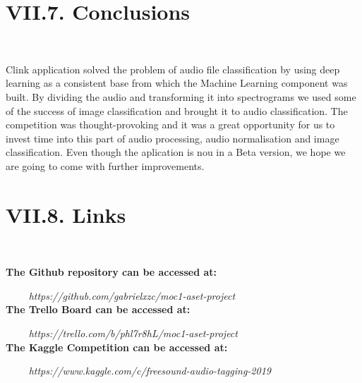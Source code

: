 \documentclass[11pt, a4papper]{report}
\theoremstyle{plain}
\theoremstyle{definition}
\theoremstyle{definition}
\theoremstyle{proposition}
\begin{document}
\section*{VII.7. Conclusions}
\

Clink application solved the problem of audio file classification by using deep learning as a consistent base from which the Machine Learning component was built. By dividing the audio and transforming it into spectrograms we used some of the success of image classification and brought it to audio classification. The competition was thought-provoking and it was a great opportunity for us to invest time into this part of audio processing, audio normalisation and image classification. Even though the aplication is nou in a Beta version, we hope we are going to come with further improvements.



\section*{VII.8. Links}
\

\textbf{\footnotemark The Github repository can be accessed at:}


\ \ \ \ \hspace{2cm} \textit{https://github.com/gabrielxzc/moc1-aset-project}
\\

\textbf{\footnotemark The Trello Board can be accessed at:}

\ \ \ \ \hspace{2cm} \textit{https://trello.com/b/phl7r8hL/moc1-aset-project}
\\

\textbf{The Kaggle Competition can be accessed at: }

\ \ \ \ \hspace{2cm} \textit{https://www.kaggle.com/c/freesound-audio-tagging-2019}




\end{document}
